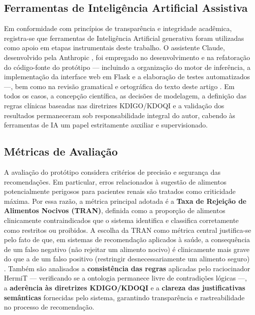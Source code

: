\documentclass[12pt, a4paper, twocolumn]{article}
\begin{document}
    \subsection{Ferramentas de Inteligência Artificial Assistiva}

Em conformidade com princípios de transparência e integridade acadêmica, registra-se que ferramentas de Inteligência Artificial generativa foram utilizadas como apoio em etapas instrumentais deste trabalho. O assistente Claude, desenvolvido pela Anthropic \cite{anthropic2026}, foi empregado no desenvolvimento e na refatoração do código-fonte do protótipo --- incluindo a organização do motor de inferência, a implementação da interface web em Flask e a elaboração de testes automatizados ---, bem como na revisão gramatical e ortográfica do texto deste artigo \cite{anthropic2026}. Em todos os casos, a concepção científica, as decisões de modelagem, a definição das regras clínicas baseadas nas diretrizes KDIGO/KDOQI e a validação dos resultados permaneceram sob responsabilidade integral do autor, cabendo às ferramentas de IA um papel estritamente auxiliar e supervisionado.

    \subsection{Métricas de Avaliação}

A avaliação do protótipo considera critérios de precisão e segurança das recomendações. Em particular, erros relacionados à sugestão de alimentos potencialmente perigosos para pacientes renais são tratados como criticidade máxima. Por essa razão, a métrica principal adotada é a \textbf{Taxa de Rejeição de Alimentos Nocivos (TRAN)}, definida como a proporção de alimentos clinicamente contraindicados que o sistema identifica e classifica corretamente como restritos ou proibidos. A escolha da TRAN como métrica central justifica-se pelo fato de que, em sistemas de recomendação aplicados à saúde, a consequência de um falso negativo (não rejeitar um alimento nocivo) é clinicamente mais grave do que a de um falso positivo (restringir desnecessariamente um alimento seguro) \cite{mckensy2022}. Também são analisados a \textbf{consistência das regras} aplicadas pelo raciocinador HermiT --- verificando se a ontologia permanece livre de contradições lógicas ---, a \textbf{aderência às diretrizes KDIGO/KDOQI} e a \textbf{clareza das justificativas semânticas} fornecidas pelo sistema, garantindo transparência e rastreabilidade no processo de recomendação.
\end{document}
